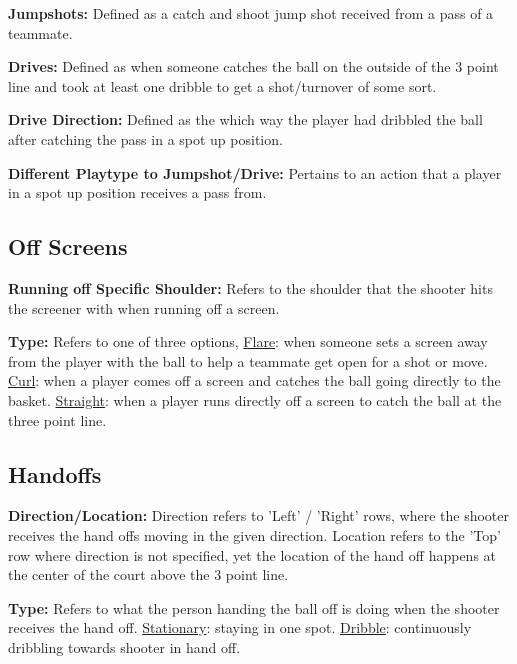 \documentclass[a4paper,12pt]{article}
\begin{document}
    \noindent \textbf{Jumpshots:} Defined as a catch and shoot jump shot received from a pass of a teammate. 
    
    \noindent \textbf{Drives:} Defined as when someone catches the ball on the outside of the 3 point line and took at least one dribble to get a shot/turnover of some sort.
    
    \noindent \textbf{Drive Direction:} Defined as the which way the player had dribbled the ball after catching the pass in a spot up position.
    
    \noindent \textbf{Different Playtype to Jumpshot/Drive:} Pertains to an action that a player in a spot up position receives a pass from. 

\vspace{.5em}

\subsection*{Off Screens}

    \noindent \textbf{Running off Specific Shoulder:} Refers to the shoulder that the shooter hits the screener with when running off a screen. 
    
    \noindent \textbf{Type:} Refers to one of three options, \underline{Flare}: when someone sets a screen away from the player with the ball to help a teammate get open for a shot or move. \underline{Curl}: when a player comes off a screen and catches the ball going directly to the basket. \underline{Straight}: when a player runs directly off a screen to catch the ball at the three point line. 

\vspace{.5em}


\subsection*{Handoffs}

    \noindent \textbf{Direction/Location:} Direction refers to 'Left' / 'Right' rows, where the shooter receives the hand offs moving in the given direction. Location refers to the 'Top' row where direction is not specified, yet the location of the hand off happens at the center of the court above the 3 point line. 
    
    \noindent \textbf{Type:} Refers to what the person handing the ball off is doing when the shooter receives the hand off. \underline{Stationary}: staying in one spot. \underline{Dribble}: continuously dribbling towards shooter in hand off.
\end{document}
